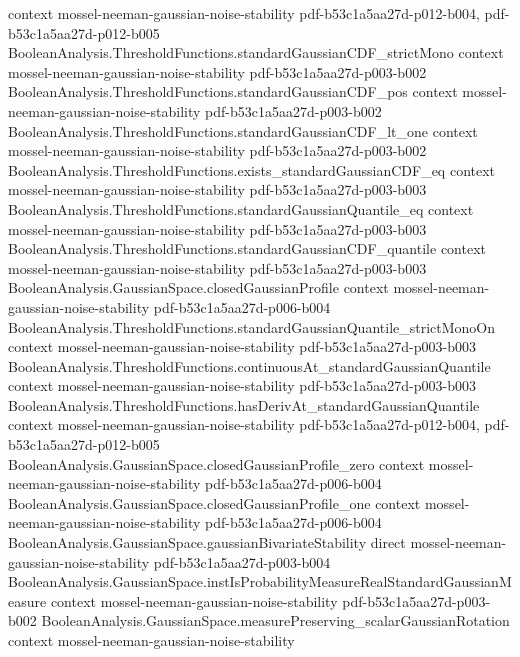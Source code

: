 \begin{lemma}
  {context}
  {mossel-neeman-gaussian-noise-stability}
  {pdf-b53c1a5aa27d-p012-b004,
    pdf-b53c1a5aa27d-p012-b005}
\proofstep
  {BooleanAnalysis.ThresholdFunctions.standardGaussianCDF_strictMono}
  {context}
  {mossel-neeman-gaussian-noise-stability}
  {pdf-b53c1a5aa27d-p003-b002}
\proofstep
  {BooleanAnalysis.ThresholdFunctions.standardGaussianCDF_pos}
  {context}
  {mossel-neeman-gaussian-noise-stability}
  {pdf-b53c1a5aa27d-p003-b002}
\proofstep
  {BooleanAnalysis.ThresholdFunctions.standardGaussianCDF_lt_one}
  {context}
  {mossel-neeman-gaussian-noise-stability}
  {pdf-b53c1a5aa27d-p003-b002}
\proofstep
  {BooleanAnalysis.ThresholdFunctions.exists_standardGaussianCDF_eq}
  {context}
  {mossel-neeman-gaussian-noise-stability}
  {pdf-b53c1a5aa27d-p003-b003}
\proofstep
  {BooleanAnalysis.ThresholdFunctions.standardGaussianQuantile_eq}
  {context}
  {mossel-neeman-gaussian-noise-stability}
  {pdf-b53c1a5aa27d-p003-b003}
\proofstep
  {BooleanAnalysis.ThresholdFunctions.standardGaussianCDF_quantile}
  {context}
  {mossel-neeman-gaussian-noise-stability}
  {pdf-b53c1a5aa27d-p003-b003}
\proofstep
  {BooleanAnalysis.GaussianSpace.closedGaussianProfile}
  {context}
  {mossel-neeman-gaussian-noise-stability}
  {pdf-b53c1a5aa27d-p006-b004}
\proofstep
  {BooleanAnalysis.ThresholdFunctions.standardGaussianQuantile_strictMonoOn}
  {context}
  {mossel-neeman-gaussian-noise-stability}
  {pdf-b53c1a5aa27d-p003-b003}
\proofstep
  {BooleanAnalysis.ThresholdFunctions.continuousAt_standardGaussianQuantile}
  {context}
  {mossel-neeman-gaussian-noise-stability}
  {pdf-b53c1a5aa27d-p003-b003}
\proofstep
  {BooleanAnalysis.ThresholdFunctions.hasDerivAt_standardGaussianQuantile}
  {context}
  {mossel-neeman-gaussian-noise-stability}
  {pdf-b53c1a5aa27d-p012-b004,
    pdf-b53c1a5aa27d-p012-b005}
\proofstep
  {BooleanAnalysis.GaussianSpace.closedGaussianProfile_zero}
  {context}
  {mossel-neeman-gaussian-noise-stability}
  {pdf-b53c1a5aa27d-p006-b004}
\proofstep
  {BooleanAnalysis.GaussianSpace.closedGaussianProfile_one}
  {context}
  {mossel-neeman-gaussian-noise-stability}
  {pdf-b53c1a5aa27d-p006-b004}
\proofstep
  {BooleanAnalysis.GaussianSpace.gaussianBivariateStability}
  {direct}
  {mossel-neeman-gaussian-noise-stability}
  {pdf-b53c1a5aa27d-p003-b004}
\proofstep
  {BooleanAnalysis.GaussianSpace.instIsProbabilityMeasureRealStandardGaussianMeasure}
  {context}
  {mossel-neeman-gaussian-noise-stability}
  {pdf-b53c1a5aa27d-p003-b002}
\proofstep
  {BooleanAnalysis.GaussianSpace.measurePreserving_scalarGaussianRotation}
  {context}
  {mossel-neeman-gaussian-noise-stability}

\end{lemma}
